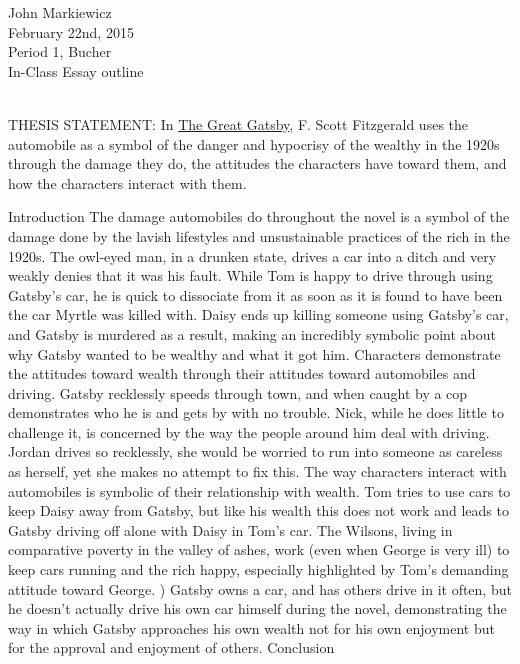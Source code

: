 \documentclass[11pt]{article}
\begin{document}
\begin{raggedleft}
John Markiewicz \\
February 22nd, 2015 \\
Period 1, Bucher \\
In-Class Essay outline \\
\end{raggedleft}
\noindent
\\ THESIS STATEMENT: In \underline{The Great Gatsby}, F. Scott Fitzgerald uses 
the automobile as a symbol of the danger and hypocrisy of the wealthy in the 
1920s through the damage they do, the attitudes the characters have toward 
them, and how the characters interact with them.
\begin{outline}[enumerate]
		\1 Introduction
		\1 The damage automobiles do throughout the novel is a symbol 
	of the damage done by the lavish lifestyles and unsustainable 
practices of the rich in the 1920s.
		\2 The owl-eyed man, in a drunken state, drives a car into a 
	ditch and very weakly denies that it was his fault.
		\2 While Tom is happy to drive through using Gatsby's car, he 
	is quick to dissociate from it as soon as it is found to have been the 
car Myrtle was killed with.
		\2 Daisy ends up killing someone using Gatsby's car, and 
	Gatsby is murdered as a result, making an incredibly symbolic point 
about why Gatsby wanted to be wealthy and what it got him.
	\1 Characters demonstrate the attitudes toward wealth through their 
attitudes toward automobiles and driving.
		\2 Gatsby recklessly speeds through town, and when caught by a 
	cop demonstrates who he is and gets by with no trouble.
		\2 Nick, while he does little to challenge it, is concerned by 
	the way the people around him deal with driving.
		\2 Jordan drives so recklessly, she would be worried to run 
	into someone as careless as herself, yet she makes no attempt to fix this.
	\1 The way characters interact with automobiles is symbolic of their 
relationship with wealth.
		\2 Tom tries to use cars to keep Daisy away from Gatsby, but 
	like his wealth this does not work and leads to Gatsby driving off 
alone with Daisy in Tom's car.
		\2 The Wilsons, living in comparative poverty in the valley of 
	ashes, work (even when George is very ill) to keep cars running and 
the rich happy, especially highlighted by Tom's demanding attitude toward George.
)	\2 Gatsby owns a car, and has others drive in it often, but he doesn't 
actually drive his own car himself during the novel, demonstrating the way in 
which Gatsby approaches his own wealth not for his own enjoyment but for the 
approval and enjoyment of others.
	\1 Conclusion
\end{outline}
\end{document}
